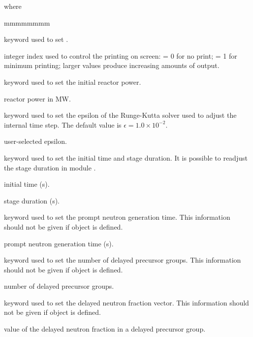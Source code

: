 \noindent where
\begin{ListeDeDescription}{mmmmmmmm}

\item[\moc{EDIT}] keyword used to set .

\item[\dusa{iprint}] integer index used to control the printing on screen:
= 0 for no print; = 1 for minimum printing; larger values produce
increasing amounts of output.

\item[\moc{POWER}] keyword used to set the initial reactor power.

\item[\dusa{power}] reactor power in MW.

\item[\moc{EPSILON}] keyword used to set the epsilon of the Runge-Kutta solver used to adjust the internal time step. The default value is $\epsilon=1.0\times 10^{-2}$.

\item[\dusa{epsilon}] user-selected epsilon.

\item[\moc{TIME}] keyword used to set the initial time and stage duration. It is possible to readjust the stage duration in module .

\item[\dusa{t0}] initial time (s).

\item[\dusa{dt}] stage duration (s).

\item[\moc{LAMBDA}] keyword used to set the prompt neutron generation time. This information should not be given if object 
is defined.

\item[\dusa{lambda}] prompt neutron generation time (s).

\item[\moc{NGROUP}] keyword used to set the number of delayed precursor groups. This information should not be given if object 
is defined.

\item[\dusa{ngroup}] number of delayed precursor groups.

\item[\moc{BETAI}] keyword used to set the delayed neutron fraction vector. This information should not be given if object 
is defined.

\item[\dusa{betai}] value of the delayed neutron fraction in a delayed precursor group.


\end{ListeDeDescription}
